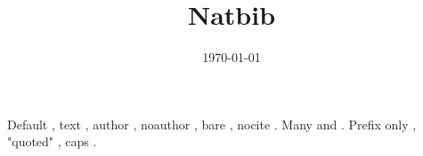 \documentclass[11pt]{article}
\date{\today}
\title{Natbib}
\begin{document}
\maketitle
\tableofcontents

Default \citep{knuth84}, text \citet{doe-2020}, author ,
noauthor \citeyearpar[see][p. 3]{doe-2020}, bare \citeyear{zed}, nocite \nocite{lower}.
Many \citep[before][after]{knuth84,doe-2020} and .
Prefix only \citep[see][]{zed}, "quoted" \citep{knuth84}, caps .



\end{document}
